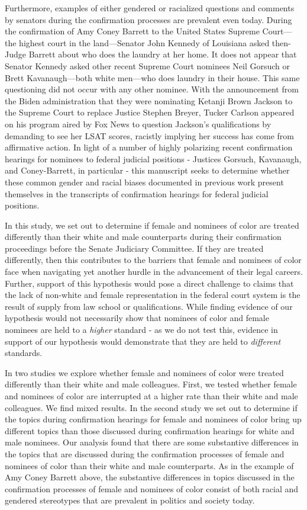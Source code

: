 \documentclass [12pt]{article}
\begin{document}
Furthermore, examples of either gendered or racialized questions and comments by senators during the confirmation processes are prevalent even today. During the confirmation of Amy Coney Barrett to the United States Supreme Court—the highest court in the land—Senator John Kennedy of Louisiana asked then-Judge Barrett about who does the laundry at her home. It does not appear that Senator Kennedy asked other recent Supreme Court nominees Neil Gorsuch or Brett Kavanaugh—both white men—who does laundry in their house. This same questioning did not occur with any other nominee. With the announcement from the Biden administration that they were nominating Ketanji Brown Jackson to the Supreme Court to replace Justice Stephen Breyer, Tucker Carlson appeared on his program aired by Fox News to question Jackson's qualifications by demanding to see her LSAT scores, racistly implying her success has come from affirmative action.  In light of a number of highly polarizing recent confirmation hearings for nominees to federal judicial positions - Justices Gorsuch, Kavanaugh, and Coney-Barrett, in particular - this manuscript seeks to determine whether these common gender and racial biases documented in previous work present themselves in the transcripts of confirmation hearings for federal judicial positions. 

In this study, we set out to determine if female and nominees of color are treated differently than their white and male counterparts during their confirmation proceedings before the Senate Judiciary Committee. If they are treated differently, then this contributes to the barriers that female and nominees of color face when navigating yet another hurdle in the advancement of their legal careers. Further, support of this hypothesis would pose a direct challenge to claims that the lack of non-white and female representation in the federal court system is the result of supply from law school or qualifications. While finding evidence of our hypothesis would not necessarily show that nominees of color and female nominees are held to a \textit{higher} standard - as we do not test this, evidence in support of our hypothesis would demonstrate that they are held to \textit{different} standards.

In two studies we explore whether female and nominees of color were treated differently than their white and male colleagues. First, we tested whether female and nominees of color are interrupted at a higher rate than their white and male colleagues. We find mixed results. In the second study we set out to determine if the topics during confirmation hearings for female and nominees of color bring up different topics than those discussed during confirmation hearings for white and male nominees. Our analysis found that there are some substantive differences in the topics that are discussed during the confirmation processes of female and nominees of color than their white and male counterparts. As in the example of Amy Coney Barrett above, the substantive differences in topics discussed in the confirmation processes of female and nominees of color consist of both racial and gendered stereotypes that are prevalent in politics and society today. 
\end{document}
